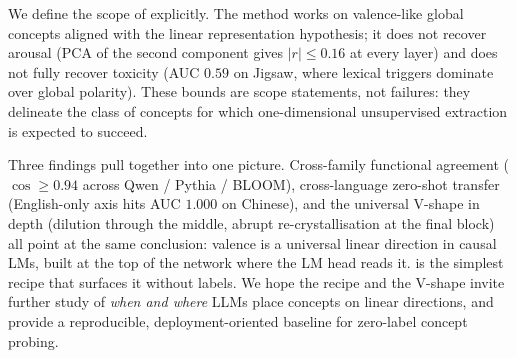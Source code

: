 We define the scope of \ours{} explicitly. The method works on
valence-like global concepts aligned with the linear representation
hypothesis; it does not recover arousal (PCA of the second component
gives $|r|\leq 0.16$ at every layer) and does not fully recover toxicity
(AUC $0.59$ on Jigsaw, where lexical triggers dominate over global
polarity). These bounds are scope statements, not failures: they
delineate the class of concepts for which one-dimensional unsupervised
extraction is expected to succeed.

Three findings pull together into one picture. Cross-family functional
agreement ($\cos \geq 0.94$ across Qwen / Pythia / BLOOM), cross-language
zero-shot transfer (English-only axis hits AUC $1.000$ on Chinese), and
the universal V-shape in depth (dilution through the middle, abrupt
re-crystallisation at the final block) all point at the same conclusion:
valence is a universal linear direction in causal LMs, built at the top
of the network where the LM head reads it. \ours{} is the simplest
recipe that surfaces it without labels. We hope the recipe and the
V-shape invite further study of \emph{when and where} LLMs place
concepts on linear directions, and provide a reproducible,
deployment-oriented baseline for zero-label concept probing.
